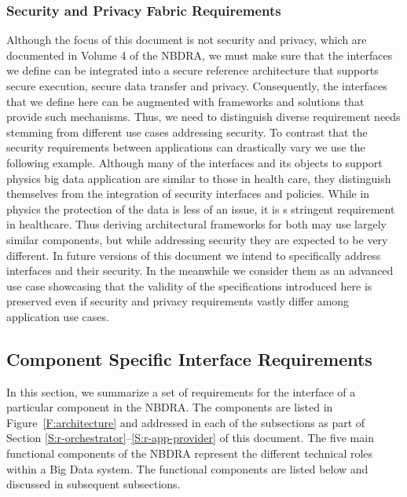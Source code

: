 \documentclass[10pt]{article}
\begin{document}
\subsubsection{Security and Privacy Fabric Requirements}

Although the focus of this document is not security and privacy, which
are documented in Volume 4 \cite{nist-vol-4} of the NBDRA, we must
make sure that the interfaces we define can be integrated into a
secure reference architecture that supports secure execution, secure
data transfer and privacy. Consequently, the interfaces that we define
here can be augmented with frameworks and solutions that provide such
mechanisms. Thus, we need to distinguish diverse requirement needs
stemming from different use cases addressing security. To contrast
that the security requirements between applications can drastically
vary we use the following example. Although many of the interfaces and
its objects to support physics big data application are similar to
those in health care, they distinguish themselves from the integration
of security interfaces and policies. While in physics the protection
of the data is less of an issue, it is s stringent requirement in
healthcare. Thus deriving architectural frameworks for both may use
largely similar components, but while addressing security they are
expected to be very different. In future versions of this document we
intend to specifically address interfaces and their security. In the
meanwhile we consider them as an advanced use case showcasing that the
validity of the specifications introduced here is preserved even if
security and privacy requirements vastly differ among application use
cases.

\subsection{Component Specific Interface Requirements}

In this section, we summarize a set of requirements for the interface
of a particular component in the NBDRA. The components are listed in
Figure~\ref{F:architecture} and addressed in each of the subsections
as part of Section \ref{S:r-orchestrator}--\ref{S:r-app-provider} of this
document. The five main functional components of the NBDRA represent
the different technical roles within a Big Data system. The functional
components are listed below and discussed in subsequent subsections.
\end{document}
